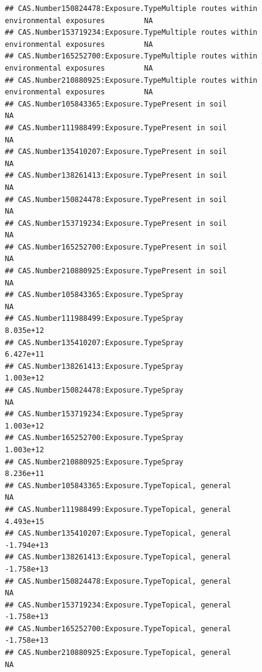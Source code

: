 \documentclass[
  12pt,
]{article}
\begin{document}
\begin{verbatim}
## CAS.Number150824478:Exposure.TypeMultiple routes within environmental exposures         NA
## CAS.Number153719234:Exposure.TypeMultiple routes within environmental exposures         NA
## CAS.Number165252700:Exposure.TypeMultiple routes within environmental exposures         NA
## CAS.Number210880925:Exposure.TypeMultiple routes within environmental exposures         NA
## CAS.Number105843365:Exposure.TypePresent in soil                                        NA
## CAS.Number111988499:Exposure.TypePresent in soil                                        NA
## CAS.Number135410207:Exposure.TypePresent in soil                                        NA
## CAS.Number138261413:Exposure.TypePresent in soil                                        NA
## CAS.Number150824478:Exposure.TypePresent in soil                                        NA
## CAS.Number153719234:Exposure.TypePresent in soil                                        NA
## CAS.Number165252700:Exposure.TypePresent in soil                                        NA
## CAS.Number210880925:Exposure.TypePresent in soil                                        NA
## CAS.Number105843365:Exposure.TypeSpray                                                  NA
## CAS.Number111988499:Exposure.TypeSpray                                           8.035e+12
## CAS.Number135410207:Exposure.TypeSpray                                           6.427e+11
## CAS.Number138261413:Exposure.TypeSpray                                           1.003e+12
## CAS.Number150824478:Exposure.TypeSpray                                                  NA
## CAS.Number153719234:Exposure.TypeSpray                                           1.003e+12
## CAS.Number165252700:Exposure.TypeSpray                                           1.003e+12
## CAS.Number210880925:Exposure.TypeSpray                                           8.236e+11
## CAS.Number105843365:Exposure.TypeTopical, general                                       NA
## CAS.Number111988499:Exposure.TypeTopical, general                                4.493e+15
## CAS.Number135410207:Exposure.TypeTopical, general                               -1.794e+13
## CAS.Number138261413:Exposure.TypeTopical, general                               -1.758e+13
## CAS.Number150824478:Exposure.TypeTopical, general                                       NA
## CAS.Number153719234:Exposure.TypeTopical, general                               -1.758e+13
## CAS.Number165252700:Exposure.TypeTopical, general                               -1.758e+13
## CAS.Number210880925:Exposure.TypeTopical, general                                       NA

\end{verbatim}
\end{document}
